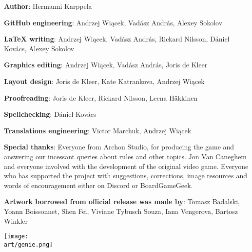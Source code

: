 
\bigbreak

\begin{multicols*}{2}

\textbf{Author}: Hermanni Karppela

\textbf{GitHub engineering}: Andrzej Wiącek, Vadász András, Alexey Sokolov

\textbf{LaTeX writing}: Andrzej Wiącek, Vadász András, Rickard Nilsson, Dániel Kovács, Alexey Sokolov

\textbf{Graphics editing}: Andrzej Wiącek, Vadász András, Joris de Kleer

\textbf{Layout design}: Joris de Kleer, Kate Katrankova, Andrzej Wiącek

\textbf{Proofreading}: Joris de Kleer, Rickard Nilsson, Leena Häkkinen

\textbf{Spellchecking}: Dániel Kovács

\textbf{Translations engineering}: Victor Marchuk, Andrzej Wiącek

\phantom{Translators placeholder}

\textbf{Special thanks}: Everyone from Archon Studio, for producing the game and answering our incessant queries about rules and other topics.
Jon Van Caneghem and everyone involved with the development of the original video game.
Everyone who has supported the project with suggestions, corrections, image resources and words of encouragement either on Discord or BoardGameGeek.

\textbf{Artwork borrowed from official release was made by}: Tomasz Badalski, Yoann Boissonnet, Shen Fei, Viviane Tybusch Souza, Iana Vengerova, Bartosz Winkler

\columnbreak

\vspace*{\fill}

\texttt{[image: \\art/genie.png]}

\vspace*{\fill}

\end{multicols*}
